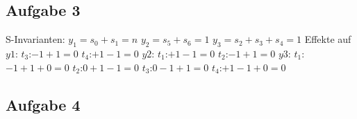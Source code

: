 \documentclass[12pt]{scrreprt}
\begin{document}
\subsection*{Aufgabe 3}
S-Invarianten:\newline
$y_1=s_0+s_1=n$\newline
$y_2=s_5+s_6=1$\newline
$y_3=s_2+s_3+s_4=1$\newline
Effekte auf\newline
$y1$:	\tabto{1.5cm}$t_3$:\tabto{2cm}$-1+1=0$\newline
		\tabto{1.5cm}$t_4$:\tabto{2cm}$+1-1=0$\newline
$y2$:	\tabto{1.5cm}$t_1$:\tabto{2cm}$+1-1=0$\newline
		\tabto{1.5cm}$t_2$:\tabto{2cm}$-1+1=0$\newline
$y3$:	\tabto{1.5cm}$t_1$:\tabto{2cm}$-1+1+0=0$\newline
		\tabto{1.5cm}$t_2$:\tabto{2cm}$0+1-1=0$\newline
		\tabto{1.5cm}$t_3$:\tabto{2cm}$0-1+1=0$\newline
		\tabto{1.5cm}$t_4$:\tabto{2cm}$+1-1+0=0$\newline

\subsection*{Aufgabe 4}
\end{document}
